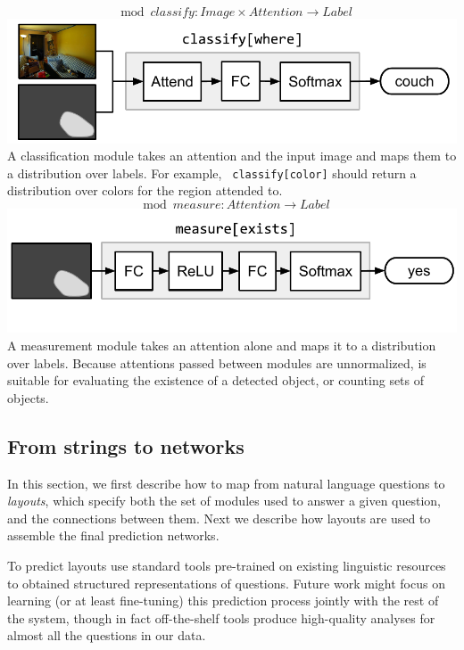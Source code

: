 \[
  \mod{classify} : \mathit{Image} \times \mathit{Attention} \to
  \mathit{Label}
\]
\includegraphics[width=\columnwidth]{fig/classify}
A classification module  takes an attention and the input
image and maps them to a distribution over labels. For example, {\small\tt
classify[color]} should return a distribution over colors for the region
attended to.\\[1em]

\[
  \mod{measure} : \mathit{Attention} \to \mathit{Label}
\]
\includegraphics[width=\columnwidth]{fig/measure}
A measurement module  takes an attention alone and maps it to
a distribution over labels. Because attentions passed between modules are
unnormalized,  is suitable for evaluating the existence of a
detected object, or counting sets of objects.

\subsection{From strings to networks}

In this section, we first describe how to map from natural language questions to
\emph{layouts}, which specify both the set of modules used to answer a given
question, and the connections between them. Next we describe how layouts are
used to assemble the final prediction networks.

To predict layouts use standard tools pre-trained on existing linguistic
resources to obtained structured representations of questions. Future work might
focus on learning (or at least fine-tuning) this prediction process jointly with
the rest of the system, though in fact off-the-shelf tools produce high-quality
analyses for almost all the questions in our data.

